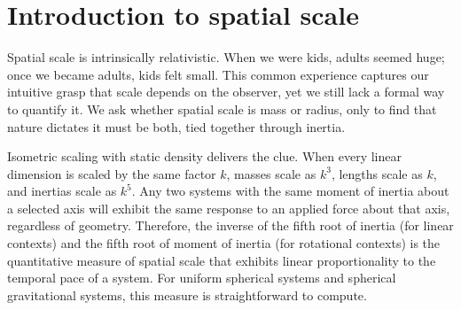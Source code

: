 
%
%


\section{Introduction to spatial scale}
Spatial scale is intrinsically relativistic. When we were kids, adults seemed huge; once we became adults, kids felt small. This common experience captures our intuitive grasp that scale depends on the observer, yet we still lack a formal way to quantify it. We ask whether spatial scale is mass or radius, only to find that nature dictates it must be both, tied together through inertia.

Isometric scaling with static density delivers the clue. When every linear dimension is scaled by the same factor $k$, masses scale as $k^3$, lengths scale as $k$, and inertias scale as $k^5$. Any two systems with the same moment of inertia about a selected axis will exhibit the same response to an applied force about that axis, regardless of geometry. Therefore, the inverse of the fifth root of inertia (for linear contexts) and the fifth root of moment of inertia (for rotational contexts) is the quantitative measure of spatial scale that exhibits linear proportionality to the temporal pace of a system. For uniform spherical systems and spherical gravitational systems, this measure is straightforward to compute.

